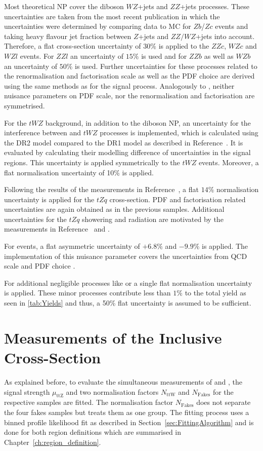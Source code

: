 \documentclass[bachelor,oneside, BCOR10mm,
			ngerman,english  %
]{GAUBM}
\begin{document}
Most theoretical NP cover the diboson $WZ$+jets and $ZZ$+jets processes. These uncertainties are taken from the most recent \ttbarZ publication \cite{atlas_ttz} in which the uncertainties were determined by comparing data to MC for $Zb$/$Zc$ events and taking heavy flavour jet fraction between $Z$+jets and $ZZ/WZ$+jets into account. Therefore, a flat cross-section uncertainty of $30\%$ is applied to the $ZZc$, $WZc$ and $WZl$ events. For $ZZl$ an uncertainty of $15\%$ is used and for $ZZb$ as well as $WZb$ an uncertainty of $50\%$ is used. Further uncertainties for these processes related to the renormalisation and factorisation scale as well as the PDF choice are derived using the same methods as for the signal \ttbarZ process. Analogously to \ttbarZ, neither nuisance parameters on PDF scale, nor the renormalisation and factorisation are symmetrised.

For the $tWZ$ background, in addition to the diboson NP, an uncertainty for the interference between \ttbarZ and $tWZ$ processes is implemented, which is calculated using the \textsc{DR2} model compared to the \textsc{DR1} model as described in Reference~\cite{uncertainty_tWZ01}. It is evaluated by calculating their modelling difference of uncertainties in the signal regions. This uncertainty is applied symmetrically to the $tWZ$ events. Moreover, a flat normalisation uncertainty of 10\% is applied. 

Following the results of the measurements in Reference~\cite{uncertainty_tZq01}, a flat $14\%$ normalisation uncertainty is applied for the $tZq$ cross-section. PDF and factorisation related uncertainties are again obtained as in the previous samples. Additional uncertainties for the $tZq$ showering and radiation are motivated by the measurements in Reference~\cite{uncertainty_tZq02} and \cite{uncertainty_tZq03}. 

For \ttbarH events, a flat asymmetric uncertainty of $+6.8\%$ and $-9.9\%$ is applied. The implementation of this nuisance parameter covers the uncertainties from QCD scale and PDF choice \cite{uncertainty_ttH01}. 

For additional negligible processes like \tttt or \ttWW a single flat normalisation uncertainty is applied. These minor processes contribute less than $1\%$ to the total yield as seen in \ref{tab:Yields} and thus, a 50\% flat uncertainty is assumed to be sufficient.


\chapter{Measurements of the Inclusive Cross-Section}
\label{ch:measurements_of_the_inclusive_cross_section}
As explained before, to evaluate the simultaneous measurements of \ttbarZ and \ttbarW, the signal strength $\mu_\text{ttZ}$ and two normalisation factors $N_\text{ttW}$ and $N_\text{Fakes}$ for the respective samples are fitted. The normalisation factor $N_\text{Fakes}$ does not separate the four fakes samples but treats them as one group. The fitting process uses a binned profile likelihood fit as described in Section~\ref{sec:FittingAlgorithm} and is done for both region definitions which are summarised in Chapter~\ref{ch:region_definition}.
\end{document}
